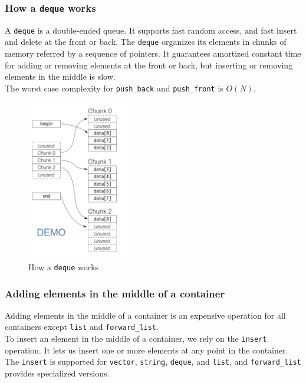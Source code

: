 \subsubsection{How a \texttt{deque} works}

A \texttt{deque} is a double-ended queue. It supports fast random access, and fast 
insert and delete at the front or back. The \texttt{deque} organizes its elements in
chunks of memory referred by a sequence of pointers. It guarantees amortized constant
time for adding or removing elements at the front or back, but inserting or removing
elements in the middle is slow.\\

The worst case complexity for \texttt{push\_back} and \texttt{push\_front} is $O(N)$.

\begin{figure}[H]
    \centering
    \includegraphics[width=0.4\textwidth]{figures/deque.png}
    \caption{How a \texttt{deque} works}
    \label{fig:deque}
\end{figure}

\subsubsection{Adding elements in the middle of a container}

Adding elements in the middle of a container is an expensive operation for all containers
except \texttt{list} and \texttt{forward\_list}. \\

To insert an element in the middle of a container, we rely on the \texttt{insert} operation.
It lets us insert one or more elements at any point in the container. The \texttt{insert}
is supported for \texttt{vector}, \texttt{string}, \texttt{deque}, and \texttt{list}, and
\texttt{forward\_list} provides specialized versions.\\


